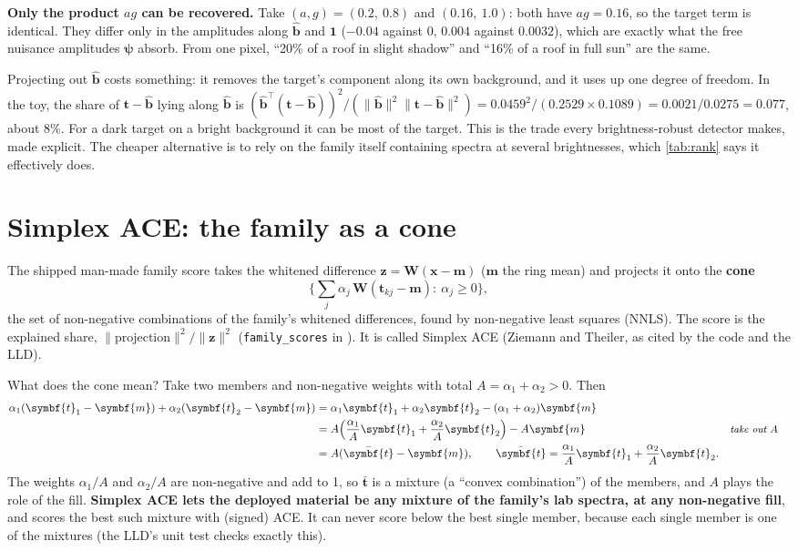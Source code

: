 \documentclass[11pt,a4paper,oneside,openany]{book}
\newcommand{\B}[1]{{\symbf{#1}}}
\newcommand{\B}[1]{{\bm{#1}}}
\newcommand{\T}{^{\top}}
\newcommand{\nrm}[1]{\lVert #1\rVert}
\newcommand{\vx}{\B{x}}
\newcommand{\vt}{\B{t}}
\newcommand{\vbh}{\hat{\B{b}}}
\newcommand{\vz}{\B{z}}
\newcommand{\vm}{\B{m}}
\newcommand{\vone}{\B{1}}
\newcommand{\vpsi}{\B{\psi}}
\newcommand{\mW}{\B{W}}
\newcommand{\why}[1]{&&\text{\small\itshape #1}}
\begin{document}
\textbf{Only the product $ag$ can be recovered.} Take $(a,g)=(0.2,\ 0.8)$ and $(0.16,\ 1.0)$: both have $ag=0.16$, so the target term is identical. They
differ only in the amplitudes along $\vbh$ and $\vone$ ($-0.04$ against $0$, $0.004$ against $0.0032$), which are exactly what the free nuisance
amplitudes $\vpsi$ absorb. From one pixel, ``20\% of a roof in slight shadow'' and ``16\% of a roof in full sun'' are the same.

Projecting out $\vbh$ costs something: it removes the target's component along its own background, and it uses up one degree of freedom. In the
toy, the share of $\vt-\vbh$ lying along $\vbh$ is $(\vbh\T(\vt-\vbh))^2/(\nrm{\vbh}^2\nrm{\vt-\vbh}^2)=0.0459^2/(0.2529\times0.1089)=0.0021/0.0275=0.077$,
about 8\%. For a dark target on a bright background it can be most of the target. This is the trade every brightness-robust detector makes, made
explicit. The cheaper alternative is to rely on the family itself containing spectra at several brightnesses, which \cref{tab:rank} says it
effectively does.

\section{Simplex ACE: the family as a cone}

The shipped man-made family score takes the whitened difference $\vz=\mW(\vx-\vm)$ ($\vm$ the ring mean) and projects it onto the
\textbf{cone}
\[
  \Big\{\textstyle\sum_j\alpha_j\,\mW(\vt_{kj}-\vm):\ \alpha_j\ge0\Big\},
\]
the set of non-negative combinations of the family's whitened differences, found by non-negative least squares (NNLS). The score is the explained
share, $\nrm{\text{projection}}^2/\nrm{\vz}^2$ (\texttt{family\_scores} in ). It is called Simplex ACE (Ziemann and Theiler,
as cited by the code and the LLD).

What does the cone mean? Take two members and non-negative weights with total $A=\alpha_1+\alpha_2>0$. Then
\begin{align*}
\alpha_1(\vt_1-\vm)+\alpha_2(\vt_2-\vm) &= \alpha_1\vt_1+\alpha_2\vt_2-(\alpha_1+\alpha_2)\vm\\
 &= A\Big(\frac{\alpha_1}{A}\vt_1+\frac{\alpha_2}{A}\vt_2\Big)-A\vm \why{take out $A$}\\
 &= A(\bar{\vt}-\vm),\qquad \bar{\vt}=\frac{\alpha_1}{A}\vt_1+\frac{\alpha_2}{A}\vt_2 .
\end{align*}
The weights $\alpha_1/A$ and $\alpha_2/A$ are non-negative and add to 1, so $\bar{\vt}$ is a mixture (a ``convex combination'') of the members, and $A$
plays the role of the fill. \textbf{Simplex ACE lets the deployed material be any mixture of the family's lab spectra, at any non-negative fill}, and
scores the best such mixture with (signed) ACE. It can never score below the best single member, because each single member is one of the mixtures
(the LLD's unit test checks exactly this).
\end{document}
